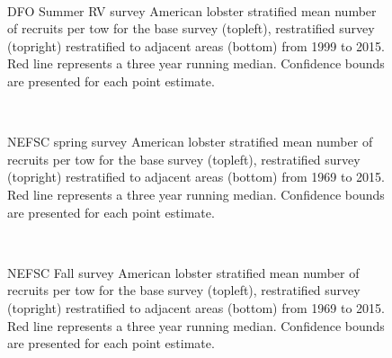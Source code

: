 \documentclass[11pt]{article}
\newcommand{\e}{/backup/bio_data/bio.lobster/figures/} %
\begin{document}
\begin{figure}
\centering
{}
\\

\caption{DFO Summer RV survey American lobster stratified mean number of recruits per tow for the base survey (topleft), restratified survey (topright) restratified to adjacent areas (bottom) from 1999 to 2015. Red line represents a three year running median. Confidence bounds are presented for each point estimate.}
\end{figure}
\clearpage



\begin{figure}
\centering
{}
\\

\caption{NEFSC spring survey American lobster stratified mean number of recruits per tow for the base survey (topleft), restratified survey (topright) restratified to adjacent areas (bottom) from 1969 to 2015. Red line represents a three year running median. Confidence bounds are presented for each point estimate. }
\end{figure}
\clearpage



\begin{figure}
\centering
{}
\\

\caption{NEFSC Fall survey American lobster stratified mean number of recruits per tow for the base survey (topleft), restratified survey (topright) restratified to adjacent areas (bottom) from 1969 to 2015. Red line represents a three year running median. Confidence bounds are presented for each point estimate. }
\end{figure}
\clearpage
\end{document}

